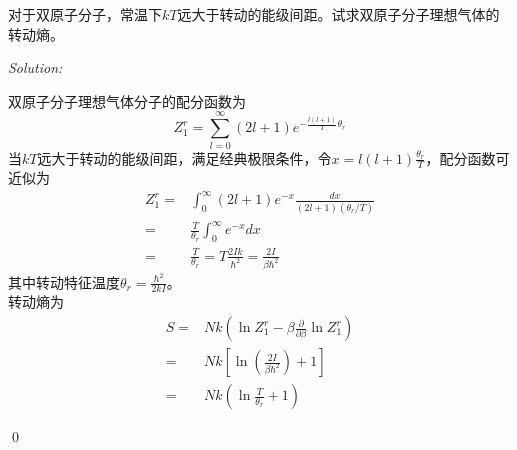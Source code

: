 \documentclass[12pt,a4paper]{article}
\newenvironment{problem}[2][Problem]{\begin{trivlist}
\item[\hskip \labelsep {\bfseries #1}\hskip \labelsep {\bfseries #2.}]}{\end{trivlist}}
\newenvironment{sol}
    {\emph{Solution:}
    }
    {
    \qed
    }
\begin{document}
\begin{problem}{7.19}
对于双原子分子，常温下$kT$远大于转动的能级间距。试求双原子分子理想气体的转动熵。
\end{problem}
\begin{sol}
双原子分子理想气体分子的配分函数为
\begin{equation}
Z_1^r=\sum_{l=0}^{\infty}(2l+1)e^{-\frac{l(l+1)}{T}\theta_r}
\end{equation}
当$kT$远大于转动的能级间距，满足经典极限条件，令$x=l(l+1)\frac{\theta_r}{T}$，配分函数可近似为
\begin{align}
\nonumber Z_1^r=&\int_0^{\infty}(2l+1)e^{-x}\frac{dx}{(2l+1)(\theta_r/T)}\\
\nonumber=&\frac{T}{\theta_r}\int_0^{\infty}e^{-x}dx\\
=&\frac{T}{\theta_r}=T\frac{2Ik}{\hbar^2}=\frac{2I}{\beta\hbar^2}
\end{align}
其中转动特征温度$\theta_r=\frac{\hbar^2}{2kI}$。\\
转动熵为
\begin{align}
\nonumber S=&Nk\left(\ln Z_1^r-\beta\frac{\partial}{\partial\beta}\ln Z_1^r\right)\\
\nonumber=&Nk\left[\ln\left(\frac{2I}{\beta\hbar^2}\right)+1\right]\\
=&Nk\left(\ln\frac{T}{\theta_r}+1\right)
\end{align}
\end{sol}
\end{document}
